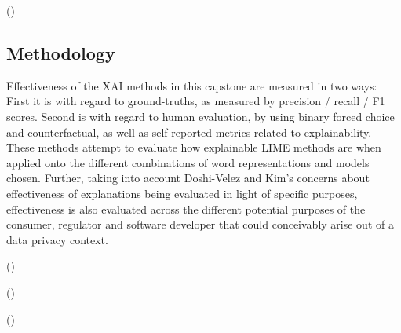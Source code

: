 (\cite{gorski2021})
\subsection{Methodology}
Effectiveness of the XAI methods in this capstone are measured in two ways: First it is with regard to ground-truths, as measured by precision / recall / F1 scores. Second is with regard to human evaluation, by using binary forced choice and counterfactual, as well as self-reported metrics related to explainability. These methods attempt to evaluate how explainable LIME methods are when applied onto the different combinations of word representations and models chosen. Further, taking into account Doshi-Velez and Kim's concerns about effectiveness of explanations being evaluated in light of specific purposes, effectiveness is also evaluated across the different potential purposes of the consumer, regulator and software developer that could conceivably arise out of a data privacy context.

(\cite{jasper_evaluating_xai})

(\cite{yalcin2022perceptions})

(\cite{francesca_2021})